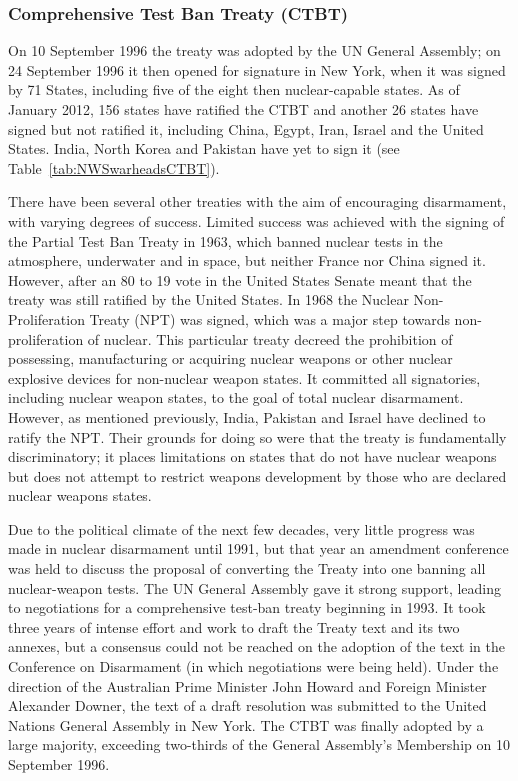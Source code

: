 \documentclass[twoside,titlepage,11pt,twocolumn,a4paper]{article}
\begin{document}
\subsubsection{Comprehensive Test Ban Treaty (CTBT)}
On 10 September 1996 the treaty was adopted by the UN General
Assembly; on 24 September 1996 it then opened for signature in New
York, when it was signed by 71 States, including five of the eight
then nuclear-capable states. As of January 2012, 156 states have
ratified the CTBT and another 26 states have signed but not ratified
it, including China, Egypt, Iran, Israel and the United States. India,
North Korea and Pakistan have yet to sign it (see
Table~\ref{tab:NWSwarheadsCTBT}).

There have been several other treaties with the aim of encouraging
disarmament, with varying degrees of success. Limited success was
achieved with the signing of the Partial Test Ban Treaty in 1963,
which banned nuclear tests in the atmosphere, underwater and in space,
but neither France nor China signed it. However, after an 80 to 19
vote in the United States Senate meant that the treaty was still
ratified by the United States. In 1968 the Nuclear Non-Proliferation
Treaty (NPT) was signed, which was a major step towards
non-proliferation of nuclear. This particular treaty decreed the
prohibition of possessing, manufacturing or acquiring nuclear weapons
or other nuclear explosive devices for non-nuclear weapon states. It
committed all signatories, including nuclear weapon states, to the
goal of total nuclear disarmament. However, as mentioned previously,
India, Pakistan and Israel have declined to ratify the NPT. Their
grounds for doing so were that the treaty is fundamentally
discriminatory; it places limitations on states that do not have
nuclear weapons but does not attempt to restrict weapons development
by those who are declared nuclear weapons states.

Due to the political climate of the next few decades, very little
progress was made in nuclear disarmament until 1991, but that year an
amendment conference was held to discuss the proposal of converting
the Treaty into one banning all nuclear-weapon tests. The UN General
Assembly gave it strong support, leading to negotiations for a
comprehensive test-ban treaty beginning in 1993. It took three years
of intense effort and work to draft the Treaty text and its two
annexes, but a consensus could not be reached on the adoption of the
text in the Conference on Disarmament (in which negotiations were
being held). Under the direction of the Australian Prime Minister John
Howard and Foreign Minister Alexander Downer, the text of a draft
resolution was submitted to the United Nations General Assembly in New
York. The CTBT was finally adopted by a large majority, exceeding
two-thirds of the General Assembly's Membership on 10 September 1996.
\end{document}
